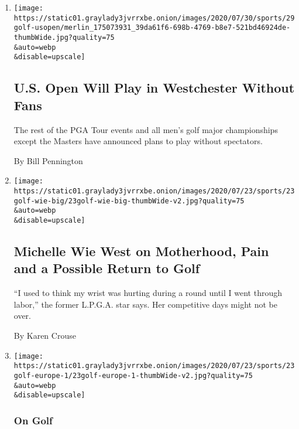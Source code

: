 \begin{enumerate}
\def\labelenumi{\arabic{enumi}.}
\item
  \href{/2020/07/29/sports/golf/us-open-westchester-without-fans.html}{}

  \texttt{[image: https://static01.graylady3jvrrxbe.onion/images/2020/07/30/sports/29golf-usopen/merlin\_175073931\_39da61f6-698b-4769-b8e7-521bd46924de-thumbWide.jpg?quality=75\\\&auto=webp\\\&disable=upscale]}

  \hypertarget{us-open-will-play-in-westchester-without-fans}{%
  \subsection{U.S. Open Will Play in Westchester Without
  Fans}\label{us-open-will-play-in-westchester-without-fans}}

  The rest of the PGA Tour events and all men's golf major championships
  except the Masters have announced plans to play without spectators.

  By Bill Pennington
\item
  \href{/2020/07/24/sports/golf/michelle-wie-golf.html}{}

  \texttt{[image: https://static01.graylady3jvrrxbe.onion/images/2020/07/23/sports/23golf-wie-big/23golf-wie-big-thumbWide-v2.jpg?quality=75\\\&auto=webp\\\&disable=upscale]}

  \hypertarget{michelle-wie-west-on-motherhood-pain-and-a-possible-return-to-golf}{%
  \subsection{Michelle Wie West on Motherhood, Pain and a Possible
  Return to
  Golf}\label{michelle-wie-west-on-motherhood-pain-and-a-possible-return-to-golf}}

  ``I used to think my wrist was hurting during a round until I went
  through labor,'' the former L.P.G.A. star says. Her competitive days
  might not be over.

  By Karen Crouse
\item
  \href{/2020/07/23/sports/golf/british-masters-newcastle-wylam.html}{}

  \texttt{[image: https://static01.graylady3jvrrxbe.onion/images/2020/07/23/sports/23golf-europe-1/23golf-europe-1-thumbWide-v2.jpg?quality=75\\\&auto=webp\\\&disable=upscale]}

  \hypertarget{on-golf}{%
  \subsubsection{On Golf}\label{on-golf}}


\end{enumerate}
